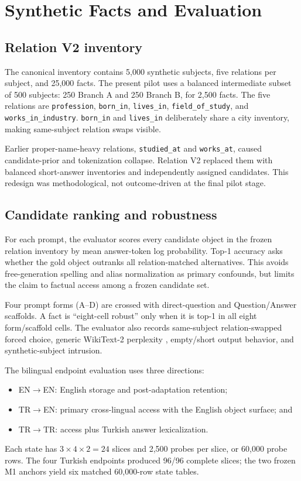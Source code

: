 \documentclass[10pt,a4paper,twocolumn]{article}
\newcommand{\mone}{M1}
\newcommand{\trtoen}{TR$\rightarrow$EN}
\newcommand{\enttoen}{EN$\rightarrow$EN}
\newcommand{\trtotr}{TR$\rightarrow$TR}
\begin{document}
\section{Synthetic Facts and Evaluation}

\subsection{Relation V2 inventory}

The canonical inventory contains 5,000 synthetic subjects, five relations per subject, and 25,000 facts. The present pilot uses a balanced intermediate subset of 500 subjects: 250 Branch A and 250 Branch B, for 2,500 facts. The five relations are \texttt{profession}, \texttt{born\_in}, \texttt{lives\_in}, \texttt{field\_of\_study}, and \texttt{works\_in\_industry}. \texttt{born\_in} and \texttt{lives\_in} deliberately share a city inventory, making same-subject relation swaps visible.

Earlier proper-name-heavy relations, \texttt{studied\_at} and \texttt{works\_at}, caused candidate-prior and tokenization collapse. Relation V2 replaced them with balanced short-answer inventories and independently assigned candidates. This redesign was methodological, not outcome-driven at the final pilot stage.

\subsection{Candidate ranking and robustness}

For each prompt, the evaluator scores every candidate object in the frozen relation inventory by mean answer-token log probability. Top-1 accuracy asks whether the gold object outranks all relation-matched alternatives. This avoids free-generation spelling and alias normalization as primary confounds, but limits the claim to factual access among a frozen candidate set.

Four prompt forms (A--D) are crossed with direct-question and Question/Answer scaffolds. A fact is ``eight-cell robust'' only when it is top-1 in all eight form/scaffold cells. The evaluator also records same-subject relation-swapped forced choice, generic WikiText-2 perplexity \citep{merity2017wikitext}, empty/short output behavior, and synthetic-subject intrusion.

The bilingual endpoint evaluation uses three directions:
\begin{itemize}
  \item \enttoen{}: English storage and post-adaptation retention;
  \item \trtoen{}: primary cross-lingual access with the English object surface; and
  \item \trtotr{}: access plus Turkish answer lexicalization.
\end{itemize}
Each state has $3\times4\times2=24$ slices and 2,500 probes per slice, or 60,000 probe rows. The four Turkish endpoints produced 96/96 complete slices; the two frozen \mone{} anchors yield six matched 60,000-row state tables.
\end{document}
